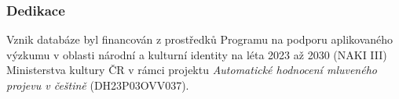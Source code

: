 \documentclass[
]{article}
\begin{document}
\hypertarget{dedikace}{%
\subsubsection{Dedikace}\label{dedikace}}

Vznik databáze byl financován z prostředků Programu na podporu
aplikovaného výzkumu v oblasti národní a kulturní identity na léta 2023
až 2030 (NAKI III) Ministerstva kultury ČR v rámci projektu
\emph{Automatické hodnocení mluveného projevu v češtině}
(DH23P03OVV037).
\end{document}
